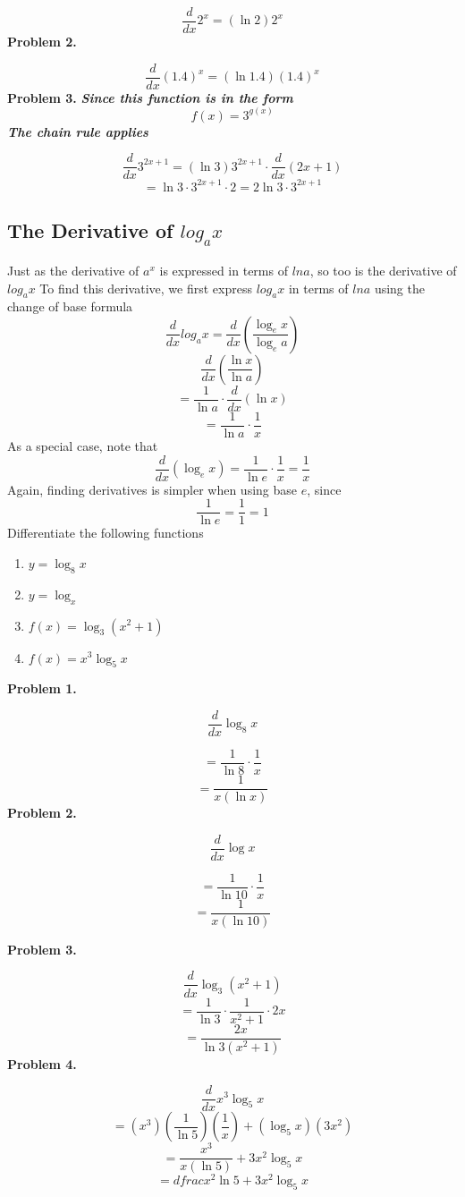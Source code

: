 \documentclass{report}
\begin{document}
$$ \frac{d}{dx}2^x = (\ln{2})2^x$$
\bigbreak \noindent
\textbf{Problem 2.}

$$ \frac{d}{dx}(1.4)^x = (\ln{1.4})(1.4)^x$$
\bigbreak \noindent
\textbf{Problem 3.}
\bigbreak \noindent
\textit{\textbf{Since this function is in the form}}
$$ f(x) = 3^{g(x)}$$
\textit{\textbf{The chain rule applies}}

$$ \frac{d}{dx}3^{2x+1} = (\ln{3})3^{2x+1} \cdot \frac{d}{dx}(2x+1)$$
$$ = \ln 3 \cdot 3^{2x+1} \cdot 2 = 2 \ln{3} \cdot 3^{2x+1}$$

\pagebreak
\subsection*{The Derivative of $log_a{x}$}
Just as the derivative of $a^x$ is expressed in terms of $ln{a}$, so too is the derivative of $log_a{x}$
\bigbreak \noindent
To find this derivative, we first express $log_a{x}$ in terms of $ln{a}$ using the change of base formula
$$ \frac{d}{dx}log_a{x} = \frac{d}{dx} \left(\frac{\log_e{x}}{\log_e{a}}\right)$$
$$ \frac{d}{dx} \left(\frac{\ln{x}}{\ln{a}}\right)$$
$$ = \frac{1}{\ln{a}} \cdot \frac{d}{dx}(\ln{x})$$
$$ = \frac{1}{\ln{a}} \cdot \frac{1}{x}$$
As a special case, note that
$$ \frac{d}{dx}(\log_e x) = \frac{1}{\ln e}\cdot \frac{1}{x} = \frac{1}{x}$$
Again, finding derivatives is simpler when using base $e$, since
$$ \frac{1}{\ln e} = \frac{1}{1} = 1$$
\q
Differentiate the following functions
\bigbreak \noindent
\begin{enumerate}
  \item $ y=\log_8{x}$
  \item $ y=\log_x$
  \item $f(x) = \log_3(x^2+1)$
  \item $f(x) = x^3\log_5{x}$
\end{enumerate}
\bigbreak \noindent \bigbreak \noindent
\textbf{Problem 1.}

$$ \frac{d}{dx}\log_8 x$$

$$ = \dfrac{1}{\ln8} \cdot \dfrac{1}{x}$$
$$ = \dfrac{1}{x(\ln{x})}$$
\bigbreak \noindent
\textbf{Problem 2.}

$$ \frac{d}{dx}\log{x}$$

$$ = \frac{1}{\ln{10}} \cdot \dfrac{1}{x}$$
$$ = \dfrac{1}{x(\ln{10})}$$

\pagebreak
\noindent\textbf{Problem 3.}

$$ \frac{d}{dx}\log_3(x^2+1)$$
$$ = \dfrac{1}{\ln{3}} \cdot \dfrac{1}{x^2+1} \cdot 2x$$
$$ = \dfrac{2x}{\ln{3}(x^2+1)}$$
\bigbreak \noindent
\textbf{Problem 4.}

$$ \frac{d}{dx} x^3\log_5{x}$$
$$ = (x^3)(\dfrac{1}{\ln{5}})(\dfrac{1}{x}) + (\log_5{x})(3x^2)$$
$$ = \dfrac{x^3}{x(\ln{5})}+3x^2\log_5{x}$$
$$ = dfrac{x^2}{\ln{5}}+3x^2\log_5{x}$$
\end{document}
